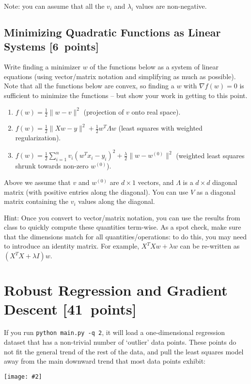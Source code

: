 \documentclass{article}
\newcommand{\blu}[1]{{\textcolor{blu}{#1}}}
\let\ask\blu
\newcommand\pts[1]{\textcolor{pointscolour}{[#1~points]}}
\newcommand{\norm}[1]{\lVert #1 \rVert}
\newcommand{\centerfig}[2]{\begin{center}\texttt{[image: \#2]}\end{center}}
\begin{document}
Note: you can assume that all the $v_i$ and $\lambda_i$ values are non-negative.

\subsection{Minimizing Quadratic Functions as Linear Systems \pts{6}} \label{sec:lin-sys}

\ask{Write finding a minimizer $w$ of the functions below as a system of linear equations} (using vector/matrix notation and simplifying as much as possible). Note that all the functions below are convex, so finding a $w$ with $\nabla f(w) = 0$ is sufficient to minimize the functions -- but show your work in getting to this point.

\begin{enumerate}
\item $f(w) = \frac{1}{2} \norm{w-v}^2$ (projection of $v$ onto real space).
%
\item $f(w)= \frac{1}{2} \norm{Xw - y}^2 + \frac{1}{2} w^T\Lambda w$ (least squares with weighted regularization).
%
\item $f(w) = \frac{1}{2} \sum_{i=1}^n v_i (w^Tx_i - y_i)^2 + \frac{\lambda}{2}\norm{w-w^{(0)}}^2$ (weighted least squares shrunk towards non-zero $w^{(0)}$). \label{item:weighted-shrunk-ls}
%
\end{enumerate}
Above we assume that $v$ and $w^{(0)}$ are $d \times 1$ vectors, and $\Lambda$ is a $d \times d$ diagonal matrix (with positive entries along the diagonal). You can use $V$ as a diagonal matrix containing the $v_i$ values along the diagonal.

Hint: Once you convert to vector/matrix notation, you can use the results from class to quickly compute these quantities term-wise.
As a spot check, make sure that the dimensions match for all quantities/operations: to do this, you may need to introduce an identity matrix. For example, $X^T X w + \lambda w$ can be re-written as $(X^T X + \lambda I)w$.


\clearpage
\section{Robust Regression and Gradient Descent \pts{41}}

If you run \verb|python main.py -q 2|, it will load a one-dimensional regression
dataset that has a non-trivial number of `outlier' data points.
These points do not fit the general trend of the rest of the data,
and pull the least squares model away from the main downward trend that most data points exhibit:
\centerfig{.7}{./figs/least_squares_outliers.pdf}
\end{document}
